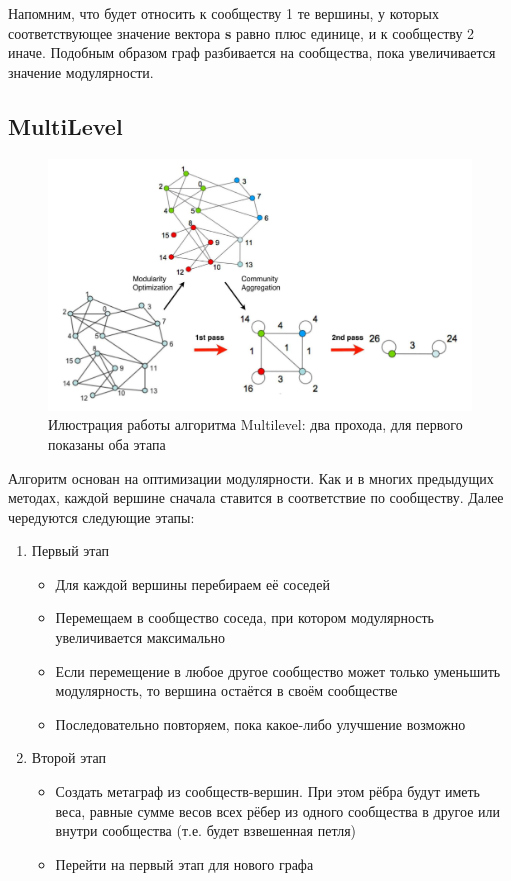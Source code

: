 \documentclass[12pt]{article}
\begin{document}
Напомним, что будет относить к сообществу 1 те вершины, у которых соответствующее значение вектора \textbf{s} равно плюс единице, и к сообществу 2 иначе. Подобным образом граф разбивается на сообщества, пока увеличивается значение модулярности.


\subsection{MultiLevel}

\begin{figure}[h]
	\begin{center}
		\includegraphics[scale=0.3]{pics/multilevel}
	\end{center}
	\caption{Илюстрация работы алгоритма Multilevel: два прохода, для первого показаны оба этапа}
\end{figure}

Алгоритм \cite{multilevel} основан на оптимизации модулярности. Как и в многих предыдущих методах, каждой вершине сначала ставится в соответствие по сообществу. Далее чередуются следующие этапы:
\begin{enumerate}
\item Первый этап
\begin{itemize}
\item Для каждой вершины перебираем её соседей
\item Перемещаем в сообщество соседа, при котором модулярность увеличивается максимально 
\item Если перемещение в любое другое сообщество может только уменьшить модулярность, то вершина остаётся в своём сообществе
\item Последовательно повторяем, пока какое-либо улучшение возможно
\end{itemize}
\item Второй этап
\begin{itemize}
\item Создать метаграф из сообществ-вершин. При этом рёбра будут иметь веса, равные сумме весов всех рёбер из одного сообщества в другое или внутри сообщества (т.е. будет взвешенная петля)
\item Перейти на первый этап для нового графа
\end{itemize}
\end{enumerate}
\end{document}
